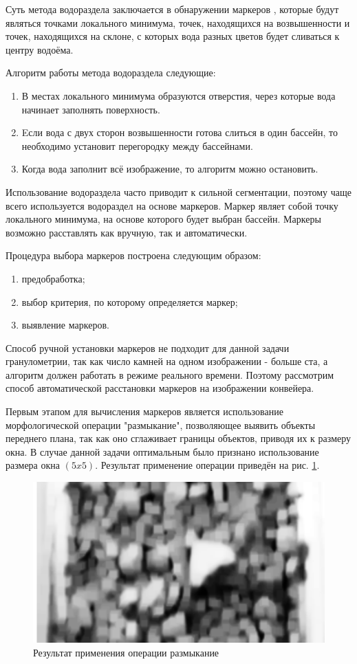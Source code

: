 \documentclass[times]{itmo-student-thesis}
\begin{document}
Суть метода водораздела заключается в обнаружении маркеров \cite{watershedmarker}, которые будут являться точками локального минимума, точек, находящихся на возвышенности и точек, находящихся на склоне, с которых вода разных цветов будет сливаться к центру водоёма. 

Алгоритм работы метода водораздела следующие:
\begin{enumerate}
	\item  В местах локального минимума образуются отверстия, через которые вода начинает заполнять поверхность.
	\item Eсли вода с двух сторон возвышенности готова слиться в один бассейн, то необходимо установит перегородку между бассейнами.
	\item Когда вода заполнит всё изображение, то алгоритм можно остановить.
\end{enumerate}


Использование водораздела часто приводит к сильной сегментации, поэтому чаще всего используется водораздел на основе маркеров.  Маркер являет собой точку локального минимума, на основе которого будет выбран бассейн. Маркеры возможно расставлять как вручную, так и автоматически.

Процедура выбора маркеров построена следующим образом:
\begin{enumerate}
	\item предобработка;
	\item выбор критерия, по которому определяется маркер;
	\item выявление маркеров.
\end{enumerate}

Способ ручной установки маркеров не подходит для данной задачи гранулометрии, так как число камней на одном изображении - больше ста, а алгоритм должен работать в режиме реального времени. Поэтому рассмотрим способ автоматической расстановки маркеров на изображении конвейера. 

Первым этапом для вычисления маркеров является использование морфологической операции "размыкание"\cite{opening}, позволяющее выявить объекты переднего плана, так как оно сглаживает границы объектов, приводя их к размеру окна. В случае данной задачи оптимальным было признано использование размера окна $(5x5)$. Результат применение операции приведён на рис. \ref{fig:opening}.

\begin{figure}[h!]
	\centering
	\includegraphics[width=0.5\linewidth]{images/opening}
	\caption{Результат применения операции размыкание}
	\label{fig:opening}
\end{figure}
\end{document}
